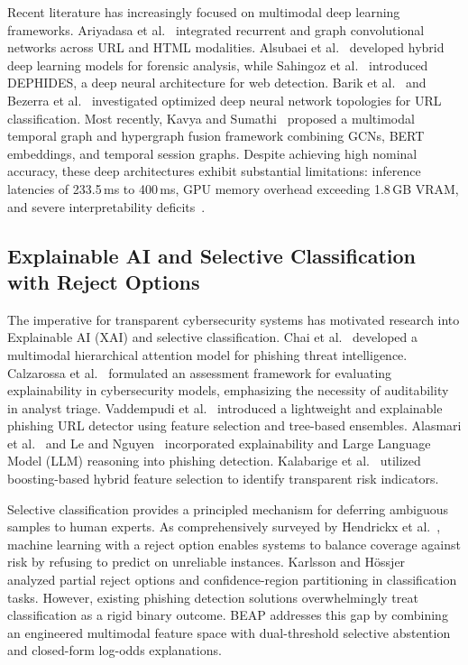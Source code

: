 \documentclass[conference]{IEEEtran}
\begin{document}
Recent literature has increasingly focused on multimodal deep learning frameworks. Ariyadasa et al.~\cite{ariyadasa2022} integrated recurrent and graph convolutional networks across URL and HTML modalities. Alsubaei et al.~\cite{alsubaei2024} developed hybrid deep learning models for forensic analysis, while Sahingoz et al.~\cite{sahingoz2024} introduced DEPHIDES, a deep neural architecture for web detection. Barik et al.~\cite{barik2025} and Bezerra et al.~\cite{bezerra2025} investigated optimized deep neural network topologies for URL classification. Most recently, Kavya and Sumathi~\cite{kavya2025,kavya2025access} proposed a multimodal temporal graph and hypergraph fusion framework combining GCNs, BERT embeddings, and temporal session graphs. Despite achieving high nominal accuracy, these deep architectures exhibit substantial limitations: inference latencies of 233.5\,ms to 400\,ms, GPU memory overhead exceeding 1.8\,GB VRAM, and severe interpretability deficits~\cite{calzarossa2025}.

\subsection{Explainable AI and Selective Classification with Reject Options}\label{selective-classification-related}

The imperative for transparent cybersecurity systems has motivated research into Explainable AI (XAI) and selective classification. Chai et al.~\cite{chai2022} developed a multimodal hierarchical attention model for phishing threat intelligence. Calzarossa et al.~\cite{calzarossa2025} formulated an assessment framework for evaluating explainability in cybersecurity models, emphasizing the necessity of auditability in analyst triage. Vaddempudi et al.~\cite{vaddempudi2025} introduced a lightweight and explainable phishing URL detector using feature selection and tree-based ensembles. Alasmari et al.~\cite{alasmari2025} and Le and Nguyen~\cite{le2026} incorporated explainability and Large Language Model (LLM) reasoning into phishing detection. Kalabarige et al.~\cite{kalabarige2023} utilized boosting-based hybrid feature selection to identify transparent risk indicators.

Selective classification provides a principled mechanism for deferring ambiguous samples to human experts. As comprehensively surveyed by Hendrickx et al.~\cite{hendrickx2024}, machine learning with a reject option enables systems to balance coverage against risk by refusing to predict on unreliable instances. Karlsson and H{\"o}ssjer~\cite{karlsson2024} analyzed partial reject options and confidence-region partitioning in classification tasks. However, existing phishing detection solutions overwhelmingly treat classification as a rigid binary outcome. BEAP addresses this gap by combining an engineered multimodal feature space with dual-threshold selective abstention and closed-form log-odds explanations.
\end{document}
